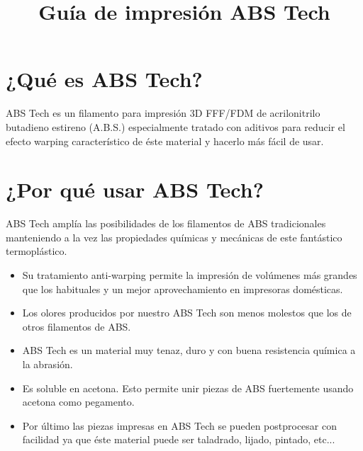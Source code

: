 \documentclass[11pt,a4paper]{article}
\title{Guía de impresión ABS Tech}
\date{}
\begin{document}

\section{¿Qué es ABS Tech?}ABS Tech es un filamento para impresión 3D FFF/FDM de acrilonitrilo butadieno estireno (A.B.S.) especialmente tratado con aditivos para reducir el efecto warping característico de éste material y hacerlo más fácil de usar.
\section{¿Por qué usar ABS Tech?}
ABS Tech amplía las posibilidades de los filamentos de ABS tradicionales manteniendo a la vez las propiedades químicas y mecánicas de este fantástico termoplástico.
\begin{itemize}
\item Su tratamiento anti-warping permite la impresión de volúmenes más grandes que los habituales y un mejor aprovechamiento en impresoras domésticas.
\item Los olores producidos por nuestro ABS Tech son menos molestos que los de otros filamentos de ABS.
\item ABS Tech es un material muy tenaz, duro y con buena resistencia química a la abrasión.
\item Es soluble en acetona. Esto permite unir piezas de ABS fuertemente usando acetona como pegamento.
\item Por último las piezas impresas en ABS Tech se pueden postprocesar con facilidad ya que éste material puede ser taladrado, lijado, pintado, etc...
\end{itemize}
\end{document}
